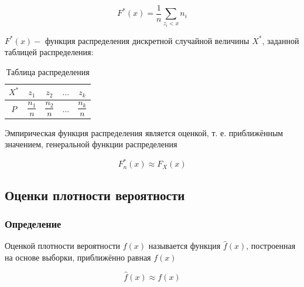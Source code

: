 \documentclass[a4paper]{article}
\begin{document}
            \begin{equation}
                F^*(x) = \dfrac{1}{n}\sum\limits_{z_i < x}n_i
            \end{equation}
            
            $F^*(x) -$ функция распределения дискретной случайной величины $X^*$, заданной таблицей распределения:
            
            \begin{table}[H]
                \centering
                \begin{tabular}{|c|c|c|c|c|}
                \hline
                    $X^*$ & $z_1$ & $z_2$ & $...$ & $z_k$ \\ \hline
                    $P$ & $\dfrac{n_1}{n}$ & $\dfrac{n_2}{n}$ & $...$ & $\dfrac{n_k}{n}$ \\ \hline
                \end{tabular}
                \caption{Таблица распределения}
                \label{tab:distrib_table}
            \end{table}
            
            Эмпирическая функция распределения является оценкой, т. е. приближённым значением, генеральной функции распределения
            
            \begin{equation}
                F^*_n(x) \approx F_X(x)
            \end{equation}
            
    \subsection{Оценки плотности вероятности}
        
        \subsubsection{Определение}
            Оценкой плотности вероятности $f(x)$ называется функция $\widehat{f}(x)$, построенная на основе выборки, приближённо равная $f(x)$
            
            \begin{equation}
                \widehat{f}(x) \approx f(x)
            \end{equation}
\end{document}

